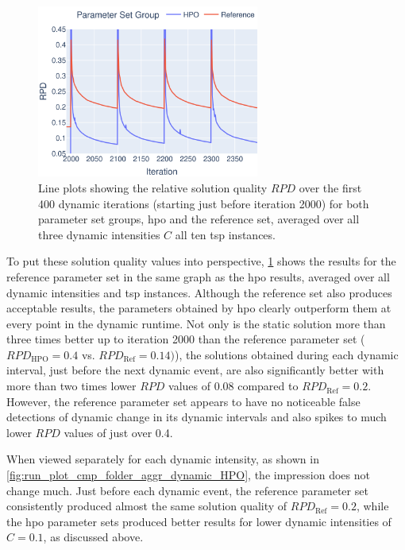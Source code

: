 \begin{figure}[h]
	\centering
	\includegraphics[width=0.65\textwidth]{results/part3/run_plot_cmp_folder_aggr_None_y_best_solution_1_to_30_HPO.svg}
	\caption[Line plots showing the relative solution quality $RPD$ over dynamic iterations for both parameter set groups averaged over dynamic intensities $C$ all \gls{tsp} instances.]{Line plots showing the relative solution quality $RPD$ over the first 400 dynamic iterations (starting just before iteration 2000) for both parameter set groups, \gls{hpo} and the reference set, averaged over all three dynamic intensities $C$ all ten \gls{tsp} instances.}
	\label{fig:run_plot_cmp_folder}
\end{figure}

To put these solution quality values into perspective, \cref{fig:run_plot_cmp_folder} shows the results for the reference parameter set in the same graph as the \gls{hpo} results, averaged over all dynamic intensities and \gls{tsp} instances. Although the reference set also produces acceptable results, the parameters obtained by \gls{hpo} clearly outperform them at every point in the dynamic runtime. Not only is the static solution more than three times better up to iteration 2000 than the reference parameter set ($RPD_\text{HPO} = 0.4$ vs. $RPD_\text{Ref}=0.14)$), the solutions obtained during each dynamic interval, just before the next dynamic event, are also significantly better with more than two times lower $RPD$ values of 0.08 compared to $RPD_\text{Ref}=0.2$. However, the reference parameter set appears to have no noticeable false detections of dynamic change in its dynamic intervals and also spikes to much lower $RPD$ values of just over 0.4.

When viewed separately for each dynamic intensity, as shown in \cref{fig:run_plot_cmp_folder_aggr_dynamic_HPO}, the impression does not change much. Just before each dynamic event, the reference parameter set consistently produced almost the same solution quality of $RPD_\text{Ref}=0.2$, while the \gls{hpo} parameter sets produced better results for lower dynamic intensities of $C=0.1$, as discussed above.


